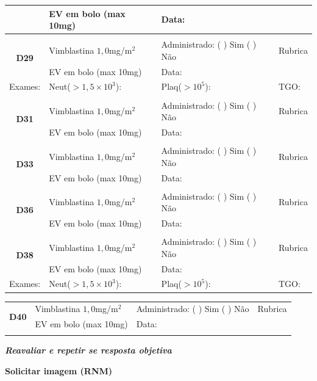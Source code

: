 \documentclass[11pt,a4paper,oldfontcommands]{memoir}
\begin{document}
\begin{center}
\begin{table}[H]
\begin{tabular}{p{1.3cm}p{5cm}|p{5cm}|p{3cm}}
    \multicolumn{1}{c|}{}&{EV em bolo (max 10mg)}&{Data:}&\\
    \hline
    \\
   \hline
          \multicolumn{1}{c|}{\multirow{2}{*}{\textbf{D29}}}&{Vimblastina \(1,0\)mg/m\(^2\)}&{Administrado: (  ) Sim (  ) Não}&{Rubrica}\\
    \multicolumn{1}{c|}{}&{EV em bolo (max 10mg)}&{Data:}&\\
    \hline
    {Exames:}&{Neut(\(>1,5\times10^3\)):}&{Plaq(\(>10^5\)):}&{TGO:}
    \\
    \hline
    \\
    \hline
    \multicolumn{1}{c|}{\multirow{2}{*}{\textbf{D31}}}&{Vimblastina \(1,0\)mg/m\(^2\)}&{Administrado: (  ) Sim (  ) Não}&{Rubrica}\\
    \multicolumn{1}{c|}{}&{EV em bolo (max 10mg)}&{Data:}&\\
    \hline
    \\
    \hline
    \multicolumn{1}{c|}{\multirow{2}{*}{\textbf{D33}}}&{Vimblastina \(1,0\)mg/m\(^2\)}&{Administrado: (  ) Sim (  ) Não}&{Rubrica}\\
    \multicolumn{1}{c|}{}&{EV em bolo (max 10mg)}&{Data:}&\\
    \hline
    \\
    \hline
    \multicolumn{1}{c|}{\multirow{2}{*}{\textbf{D36}}}&{Vimblastina \(1,0\)mg/m\(^2\)}&{Administrado: (  ) Sim (  ) Não}&{Rubrica}\\
    \multicolumn{1}{c|}{}&{EV em bolo (max 10mg)}&{Data:}&\\
    \hline
    \\
    \hline
    \multicolumn{1}{c|}{\multirow{2}{*}{\textbf{D38}}}&{Vimblastina \(1,0\)mg/m\(^2\)}&{Administrado: (  ) Sim (  ) Não}&{Rubrica}\\
    \multicolumn{1}{c|}{}&{EV em bolo (max 10mg)}&{Data:}&\\
    \hline
    {Exames:}&{Neut(\(>1,5\times10^3\)):}&{Plaq(\(>10^5\)):}&{TGO:}
    \\
    \hline
\end{tabular}
\end{table}
\begin{table}[H]
\begin{tabular}{p{1cm}p{5cm}|p{5cm}|p{3cm}}
    \hline
    \multicolumn{1}{c|}{\multirow{2}{*}{\textbf{D40}}}&{Vimblastina \(1,0\)mg/m\(^2\)}&{Administrado: (  ) Sim (  ) Não}&{Rubrica}\\
    \multicolumn{1}{c|}{}&{EV em bolo (max 10mg)}&{Data:}&\\
    \hline
    \\
   \hline
\end{tabular}
\end{table}
\textbf{\textit{Reavaliar e repetir se resposta objetiva}}

\textbf{Solicitar imagem (RNM)}
\end{center}
\end{document}

